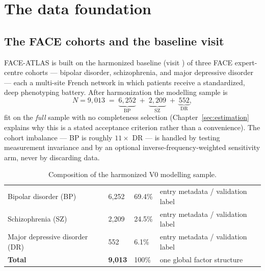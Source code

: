 \section{The data foundation}
\label{sec:data}

\subsection{The FACE cohorts and the baseline visit}
FACE-ATLAS is built on the harmonized baseline (visit ) of three FACE expert-centre cohorts ---
bipolar disorder, schizophrenia, and major depressive disorder --- each a multi-site French network in which
patients receive a standardized, deep phenotyping battery. After harmonization the modelling sample is
\[
N = 9{,}013 \;=\; \underbrace{6{,}252}_{\text{BP}} \;+\; \underbrace{2{,}209}_{\text{SZ}} \;+\; \underbrace{552}_{\text{DR}} ,
\]
fit on the \emph{full} sample with no completeness selection (Chapter~\ref{sec:estimation} explains why this is
a stated acceptance criterion rather than a convenience). The cohort imbalance --- BP is roughly $11\times$ DR
--- is handled by testing measurement invariance and by an optional inverse-frequency-weighted sensitivity
arm, never by discarding data.

\begin{table}[h]\centering\small\sffamily
\caption{Composition of the harmonized V0 modelling sample.}
\label{tab:cohorts}
\begin{tabular}{L{4.6cm} R{2.2cm} R{2.4cm} L{4.6cm}}
\toprule
{} &  &  & \\
\midrule
{} Bipolar disorder (BP) & 6{,}252 & 69.4\% & entry metadata / validation label\\
Schizophrenia (SZ) & 2{,}209 & 24.5\% & entry metadata / validation label\\
 Major depressive disorder (DR) & 552 & 6.1\% & entry metadata / validation label\\
\midrule
\textbf{Total} & \textbf{9{,}013} & 100\% & one global factor structure\\
\bottomrule
\end{tabular}
\end{table}

